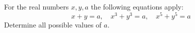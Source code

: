 For the real numbers $x,y,a$ the following equations apply:
$$x + y = a,\quad x^3 + y^3 = a,\quad x^5 + y^5 = a$$
Determine all possible values of $a$.
